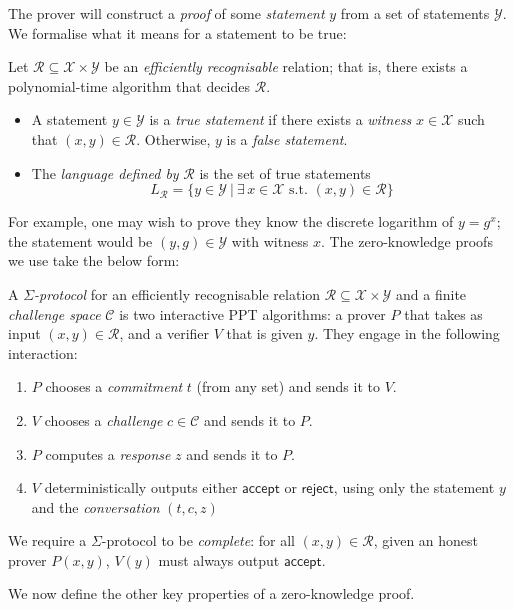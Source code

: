 \documentclass[12pt,a4paper]{article}
\theoremstyle{definition}
\begin{document}
The prover will construct a \textit{proof} of some \textit{statement} $y$ from a set of statements $\mathcal{Y}$. We formalise what it means for a statement to be true:
\begin{definition}
    Let $\mathcal{R}\subseteq\mathcal{X}\times\mathcal{Y}$ be an \textit{efficiently recognisable} relation; that is, there exists a polynomial-time algorithm that decides $\mathcal{R}$.
    \begin{itemize}
        \item A statement $y\in\mathcal{Y}$ is a \textit{true statement} if there exists a \textit{witness} $x\in\mathcal{X}$ such that $(x, y)\in\mathcal{R}$. Otherwise, $y$ is a \textit{false statement}.
        \item The \textit{language defined by} $\mathcal{R}$ is the set of true statements
        $$L_\mathcal{R}=\{y\in\mathcal{Y}\ |\ \exists\, x\in\mathcal{X}\text{ s.t. }(x,y)\in\mathcal{R}\}$$
    \end{itemize}
\end{definition}
For example, one may wish to prove they know the discrete logarithm of $y=g^x$; the statement would be $(y, g)\in\mathcal{Y}$ with witness $x$. The zero-knowledge proofs we use take the below form:
\begin{definition}
    A $\mathit{\Sigma}$\textit{-protocol} for an efficiently recognisable relation $\mathcal{R}\subseteq\mathcal{X}\times\mathcal{Y}$ and a finite \textit{challenge space} $\mathcal{C}$ is two interactive PPT algorithms: a prover $P$ that takes as input $(x, y)\in\mathcal{R}$, and a verifier $V$ that is given $y$. They engage in the following interaction:
    \begin{enumerate}
        \item $P$ chooses a \textit{commitment} $t$ (from any set) and sends it to $V$.
        \item $V$ chooses a \textit{challenge} $c\in\mathcal{C}$ and sends it to $P$.
        \item $P$ computes a \textit{response} $z$ and sends it to $P$.
        \item $V$ deterministically outputs either $\mathsf{accept}$ or $\mathsf{reject}$, using only the statement $y$ and the \textit{conversation} $(t, c, z)$
    \end{enumerate}
    We require a $\Sigma$-protocol to be \textit{complete}: for all $(x, y)\in\mathcal{R}$, given an honest prover $P(x, y)$, $V(y)$ must always output $\mathsf{accept}$.
\end{definition}
We now define the other key properties of a zero-knowledge proof.
\end{document}
